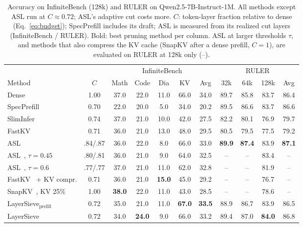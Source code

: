 \documentclass[10pt,conference]{IEEEtran}
\begin{document}
\begin{table}[t]
\centering
\caption{Accuracy on InfiniteBench (128k) and RULER on Qwen2.5-7B-Instruct-1M. All methods except ASL run at $C\approx0.72$; ASL's adaptive cut costs more. $C$: token-layer fraction relative to dense (Eq.~\eqref{eq:budget}); SpecPrefill includes its draft; ASL is measured from its realized cut layers (InfiniteBench / RULER). Bold: best pruning method per column. ASL at larger thresholds $\tau$, and methods that also compress the KV cache (SnapKV after a dense prefill, $C=1$), are evaluated on RULER at 128k only (--).}
\label{tab:main}
\setlength{\tabcolsep}{4.5pt}
\small
\begin{tabular}{l c ccccc cccc}
\toprule
& & \multicolumn{5}{c}{InfiniteBench} & \multicolumn{4}{c}{RULER} \\
\cmidrule(lr){3-7}\cmidrule(lr){8-11}
Method & $C$ & Math & Code & Dia & KV & Avg & 32k & 64k & 128k & Avg \\
\midrule
Dense & 1.00 & 37.0 & 22.0 & 11.0 & 66.0 & 34.0 & 89.7 & 85.8 & 83.7 & 86.4 \\
\midrule
SpecPrefill~\cite{liu2025specprefill} & 0.70 & 22.0 & 20.0 & 5.0 & 34.0 & 20.2 & 89.5 & 86.6 & 83.7 & 86.6 \\
SlimInfer~\cite{long2026sliminfer} & 0.74 & 37.0 & 21.0 & 10.0 & 42.0 & 27.5 & 82.2 & 80.1 & 76.9 & 79.7 \\
FastKV~\cite{jo2026fastkv} & 0.71 & 36.0 & 21.0 & 13.0 & 48.0 & 29.5 & 80.5 & 79.5 & 77.5 & 79.2 \\
ASL~\cite{taniguchi2026asl} & .84/.87 & 36.0 & 22.0 & 8.0 & 66.0 & 33.0 & \textbf{89.9} & \textbf{87.4} & 83.9 & \textbf{87.1} \\
ASL~\cite{taniguchi2026asl}, $\tau=0.45$ & .80/.81 & 36.0 & 21.0 & 9.0 & 64.0 & 32.5 & -- & -- & 83.4 & -- \\
ASL~\cite{taniguchi2026asl}, $\tau=0.6$ & .77/.77 & 37.0 & 21.0 & 11.0 & 62.0 & 32.8 & -- & -- & 81.9 & -- \\
\midrule
FastKV~\cite{jo2026fastkv} + KV compr. & 0.71 & 36.0 & 21.0 & \textbf{15.0} & 45.0 & 29.2 & -- & -- & 76.7 & -- \\
SnapKV~\cite{li2024snapkv}, KV 25\% & 1.00 & \textbf{38.0} & 22.0 & 11.0 & 43.0 & 28.5 & -- & -- & 78.6 & -- \\
\midrule
LayerSieve$_{\text{prefill}}$ & 0.72 & 35.0 & 21.0 & 11.0 & \textbf{67.0} & \textbf{33.5} & 88.9 & 86.7 & 83.9 & 86.5 \\
LayerSieve & 0.72 & 34.0 & \textbf{24.0} & 9.0 & 66.0 & 33.2 & 89.4 & 87.0 & \textbf{84.0} & 86.8 \\
\bottomrule
\end{tabular}
\end{table}
\end{document}
